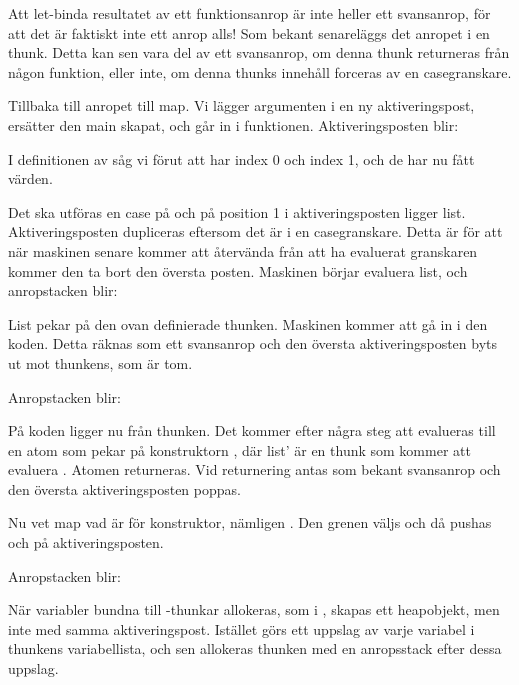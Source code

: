 \documentclass[../Core]{subfiles}
\begin{document}
Att let-binda resultatet av ett
funktionsanrop är inte heller ett svansanrop, för att det är faktiskt inte ett
anrop alls! Som bekant senareläggs det anropet i en thunk. Detta kan sen vara
del av ett svansanrop, om denna thunk returneras från någon funktion, eller inte,
om denna thunks innehåll forceras av en casegranskare.

Tillbaka till anropet till map. 
Vi lägger argumenten i en ny aktiveringspost, ersätter den main skapat,
och går in i funktionen. 
Aktiveringsposten blir:
\begin{codeEx}
\end{codeEx}
I definitionen av  såg vi förut att  har index 0 och
 index 1, och de har nu fått värden.

Det ska utföras en case på  och på position 1 i
aktiveringsposten ligger list. Aktiveringsposten dupliceras eftersom
det är i en casegranskare. Detta är för att när maskinen senare kommer
att återvända från att ha evaluerat granskaren kommer den ta bort den 
översta posten. Maskinen börjar evaluera list, och anropstacken blir:
\begin{codeEx}
\end{codeEx}

List pekar på den ovan definierade thunken. Maskinen kommer att gå in i den
koden. Detta räknas som ett svansanrop och den översta aktiveringsposten byts
ut mot thunkens, som är tom.

Anropstacken blir:
\begin{codeEx}
\end{codeEx}

På koden ligger nu  från thunken. 
Det kommer efter några steg att evalueras till en atom 
som pekar på 
konstruktorn , där list' är
en thunk som kommer att evaluera . 
Atomen
returneras. Vid returnering antas som bekant svansanrop och 
den översta aktiveringsposten poppas.


Nu vet map vad  är för konstruktor, nämligen
. Den grenen väljs och då pushas  och 
 på aktiveringsposten. 

Anropstacken blir:
\begin{codeEx}
\end{codeEx}

När variabler bundna till -thunkar allokeras, som 
i , skapas ett heapobjekt, men inte med samma aktiveringspost.
Istället görs ett uppslag av varje variabel i thunkens variabellista, och
sen allokeras thunken med en anropsstack efter dessa uppslag. 
\end{document}
